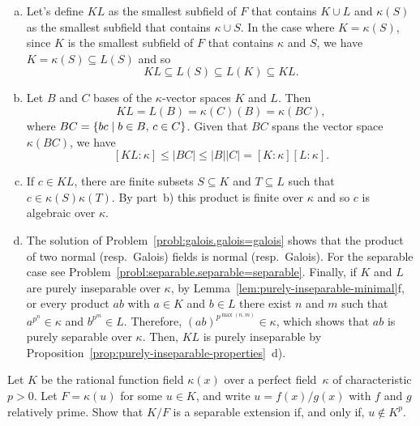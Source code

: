 \begin{solution}${}$
    \begin{enumerate}[a), font=\upshape]
        \item Let's define $KL$ as the smallest subfield of $F$ that contains $K\cup L$ and $\kappa(S)$ as the smallest subfield that contains $\kappa\cup S$. In the case where $K=\kappa(S)$, since $K$ is the smallest subfield of $F$ that contains $\kappa$ and $S$, we have $K=\kappa(S)\subseteq L(S)$ and so
        $$
            KL \subseteq L(S)\subseteq L(K)\subseteq KL.
        $$

        \item Let $B$ and $C$ bases of the $\kappa$-vector spaces $K$ and $L$. Then 
        $$
            KL=L(B)=\kappa(C)(B)=\kappa(BC),
        $$
        where $BC=\{bc\mid b\in B,\,c\in C\}$. Given that $BC$ spans the vector space $\kappa(BC)$, we have
        $$
            [KL:\kappa]\le |BC|\le |B||C|=[K:\kappa][L:\kappa].
        $$

        \item If $c\in KL$, there are finite subsets $S\subseteq K$ and $T\subseteq L$ such that $c\in\kappa(S)\kappa(T)$. By part~b) this product is finite over $\kappa$ and so $c$ is algebraic over $\kappa$.

        \item The solution of Problem~\ref{probl:galois.galois=galois} shows that the product of two normal (resp.\ Galois) fields is normal (resp.\ Galois). For the separable case see Problem~\ref{probl:separable.separable=separable}. Finally, if $K$ and $L$ are purely inseparable over $\kappa$, by Lemma~\ref{lem:purely-inseparable-minimal}f, or every product $ab$ with $a\in K$ and $b\in L$ there exist $n$ and $m$ such that $a^{p^n}\in\kappa$ and $b^{p^m}\in L$. Therefore, $(ab)^{p^{\max(n,m)}}\in\kappa$, which shows that $ab$ is purely separable over $\kappa$. Then, $KL$ is purely inseparable by Proposition~\ref{prop:purely-inseparable-properties}~d).
    \end{enumerate}
\end{solution}

\begin{probl}
    Let\/ $K$ be the rational function field\/ $\kappa(x)$ over a perfect field\/~$\kappa$ of characteristic\/ $p > 0$. Let\/ $F = \kappa(u)$ for some\/ $u \in K$, and write\/ $u = f(x)/g(x)$ with\/ $f$ and\/ $g$ relatively prime. Show that\/ $K / F$ is a separable extension if, and only if, $u \notin K^p$.
\end{probl}

